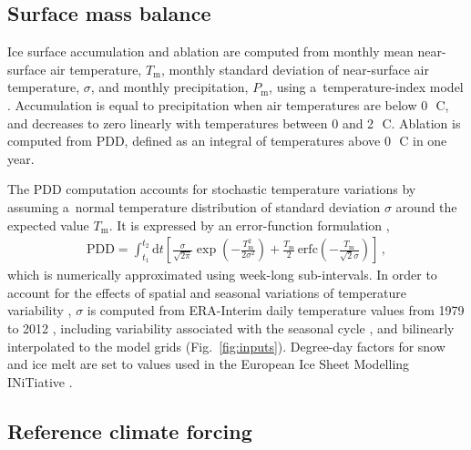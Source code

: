 \documentclass[tc, manuscript]{copernicus}
\begin{document}
\subsection{Surface mass balance}
\label{sec:surface}

    Ice surface accumulation and ablation are computed from monthly mean
    near-surface air temperature, $T_{\mathrm{m}}$, monthly standard deviation
    of near-surface air temperature, $\sigma$, and monthly precipitation,
    $P_{\mathrm{m}}$, using a~temperature-index model
    \citep[e.g.,][]{Hock.2003}. Accumulation is equal to precipitation when air
    temperatures are below 0\,\unit{{\degree}C}, and decreases to zero linearly
    with temperatures between 0 and 2\,\unit{{\degree}C}. Ablation is computed
    from PDD, defined as an integral of temperatures above 0\,\unit{{\degree}C}
    in one year.

    The PDD computation accounts for stochastic temperature variations by
    assuming a~normal temperature distribution of standard deviation $\sigma$
    around the expected value $T_{\mathrm{m}}$. It is expressed by an
    error-function formulation \citep{Calov.Greve.2005},
    \begin{align}
      {\text{PDD}} = \int_{t_1}^{t_2} \mathrm{d}t
        \left[\frac{\sigma}{\sqrt{2\pi}}
                \exp\left({-\frac{T_{\mathrm{m}}^2}{2\sigma^2}}\right)
              + \frac{T_{\mathrm{m}}}{2} \, {\text{erfc}}
                \left(-\frac{T_{\mathrm{m}}}{\sqrt{2}\sigma}\right)\right] \,,
    \end{align}
    which is numerically approximated using week-long sub-intervals. In
    order to account for the effects of spatial and seasonal variations of
    temperature variability \citep{Seguinot.2013}, $\sigma$ is computed
    from ERA-Interim daily temperature values from 1979 to 2012
    \citep{Mesinger.etal.2006}, including variability associated with the
    seasonal cycle \citep{Seguinot.2013}, and bilinearly interpolated to the
    model grids (Fig.~\ref{fig:inputs}). Degree-day factors for snow and ice
    melt are set to values used in the European Ice Sheet Modelling INiTiative
    \citep[Table~\ref{tab:params}; EISMINT,][]{Huybrechts.1998}.


\subsection{Reference climate forcing}
\label{sec:atm}
\end{document}
